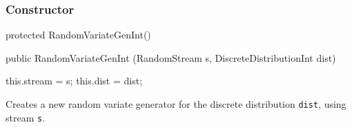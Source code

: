 \subsubsection* {Constructor}
\begin{code}\begin{hide}
   protected RandomVariateGenInt() {}\end{hide}

   public RandomVariateGenInt (RandomStream s, DiscreteDistributionInt dist) \begin{hide} {
      this.stream = s;
      this.dist   = dist;
   }\end{hide}
\end{code}
  \begin{tabb}  Creates a new random variate generator for the discrete
    distribution \texttt{dist}, using stream \texttt{s}.
 \end{tabb}
\begin{htmlonly}
\end{htmlonly}

